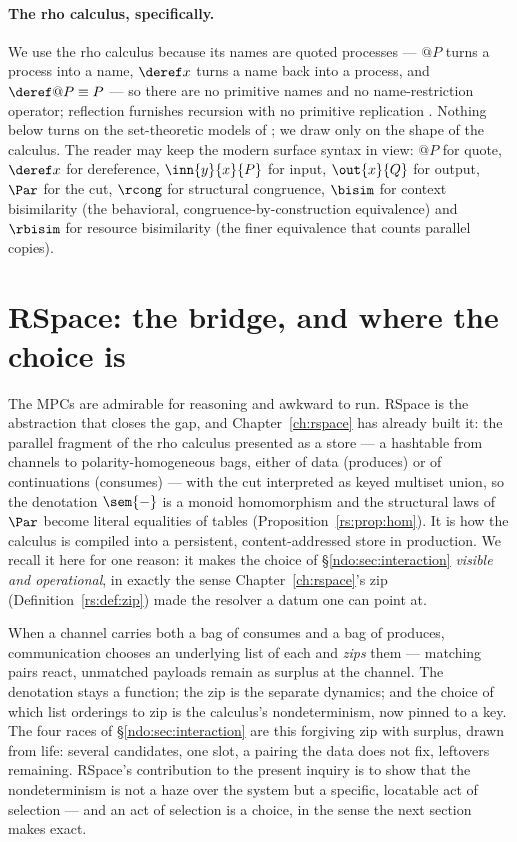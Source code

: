 \paragraph{The rho calculus, specifically.}
We use the rho calculus because its names are quoted processes --- $@P$ turns a
process into a name, $\deref x$ turns a name back into a process, and
$\deref @P \equiv P$ --- so there are no primitive names and no name-restriction
operator; reflection furnishes recursion with no primitive replication \cite{RHO}.
Nothing below turns on the set-theoretic models of \cite{qcs,knot}; we draw only on
the shape of the calculus. The reader may keep the modern surface syntax in view:
$@P$ for quote, $\deref x$ for dereference, $\inn{y}{x}{P}$ for input, $\out{x}{Q}$
for output, $\Par$ for the cut, $\rcong$ for structural congruence, $\bisim$ for
context bisimilarity (the behavioral, congruence-by-construction equivalence) and
$\rbisim$ for resource bisimilarity (the finer equivalence that counts parallel
copies).


\section{RSpace: the bridge, and where the choice is}\label{ndo:sec:rspace}

The MPCs are admirable for reasoning and awkward to run. RSpace is the abstraction
that closes the gap, and Chapter~\ref{ch:rspace} has already built it: the parallel
fragment of the rho calculus presented as a store --- a hashtable from channels to
polarity-homogeneous bags, either of data (produces) or of continuations (consumes)
--- with the cut interpreted as keyed multiset union, so the denotation $\sem{-}$ is
a monoid homomorphism and the structural laws of $\Par$ become literal equalities of
tables (Proposition~\ref{rs:prop:hom}). It is how the calculus is compiled into a
persistent, content-addressed store in production. We recall it here for one reason:
it makes the choice of \S\ref{ndo:sec:interaction} \emph{visible and operational},
in exactly the sense Chapter~\ref{ch:rspace}'s zip (Definition~\ref{rs:def:zip}) made
the resolver a datum one can point at.

When a channel carries both a bag of consumes and a bag of produces, communication
chooses an underlying list of each and \emph{zips} them --- matching pairs react,
unmatched payloads remain as surplus at the channel. The denotation stays a
function; the zip is the separate dynamics; and the choice of which list orderings
to zip is the calculus's nondeterminism, now pinned to a key. The four races of
\S\ref{ndo:sec:interaction} are this forgiving zip with surplus, drawn from life:
several candidates, one slot, a pairing the data does not fix, leftovers remaining.
RSpace's contribution to the present inquiry is to show that the nondeterminism is
not a haze over the system but a specific, locatable act of selection --- and an act
of selection is a choice, in the sense the next section makes exact.

